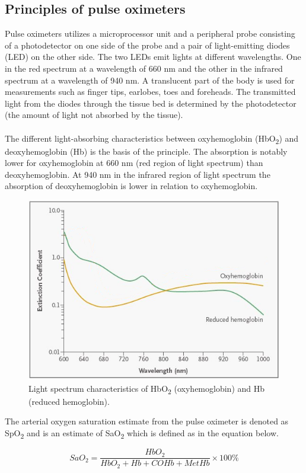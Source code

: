 \documentclass{report}
\begin{document}
\subsection{Principles of pulse oximeters}
Pulse oximeters utilizes a microprocessor unit and a peripheral probe consisting of a photodetector on one side of the probe and a pair of light-emitting diodes (LED) on the other side. The two LEDs emit lights at different wavelengths. One in the red spectrum at a wavelength of 660 nm and the other in the infrared spectrum at a wavelength of 940 nm. A translucent part of the body is used for measurements such as finger tips, earlobes, toes and foreheads. The transmitted light from the diodes through the tissue bed is determined by the photodetector (the amount of light not absorbed by the tissue). 
\\
\\
The different light-absorbing characteristics between oxyhemoglobin (HbO\textsubscript{2}) and deoxyhemoglobin (Hb) is the basis of the principle. The absorption is notably lower for oxyhemoglobin at 660 nm (red region of light spectrum) than deoxyhemoglobin. At 940 nm in the infrared region of light spectrum the absorption of deoxyhemoglobin is lower in relation to oxyhemoglobin.

\begin{figure}[H]
\centering
  \includegraphics[width=.55\linewidth]{hemoglobin}
  \caption{Light spectrum characteristics of HbO\textsubscript{2} (oxyhemoglobin) and Hb (reduced hemoglobin).}
\end{figure}

\noindent
The arterial oxygen saturation estimate from the pulse oximeter is denoted as SpO\textsubscript{2} and is an estimate of SaO\textsubscript{2} which is defined as in the equation below.

\begin{equation}
SaO_{2} = \frac{HbO_{2}}{HbO_{2} + Hb + COHb + MetHb} \times 100 \%
\end{equation}
\end{document}
